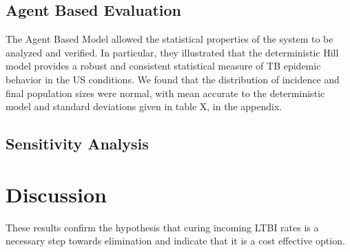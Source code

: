 \documentclass{amsart}
\begin{document}
\subsection{Agent Based Evaluation}
The Agent Based Model allowed the statistical properties of the system to be
analyzed and verified. In particular, they illustrated that the deterministic
Hill model provides a robust and consistent statistical measure of TB epidemic
behavior in the US conditions. We found that the distribution of incidence and
final population sizes were normal, with mean accurate to the deterministic
model and standard deviations given in table X, in the appendix. 

\subsection{Sensitivity Analysis}
\section{Discussion}
These results confirm the hypothesis that curing incoming LTBI rates is a
necessary step towards elimination and indicate that it is a cost effective
option. 
\end{document}
